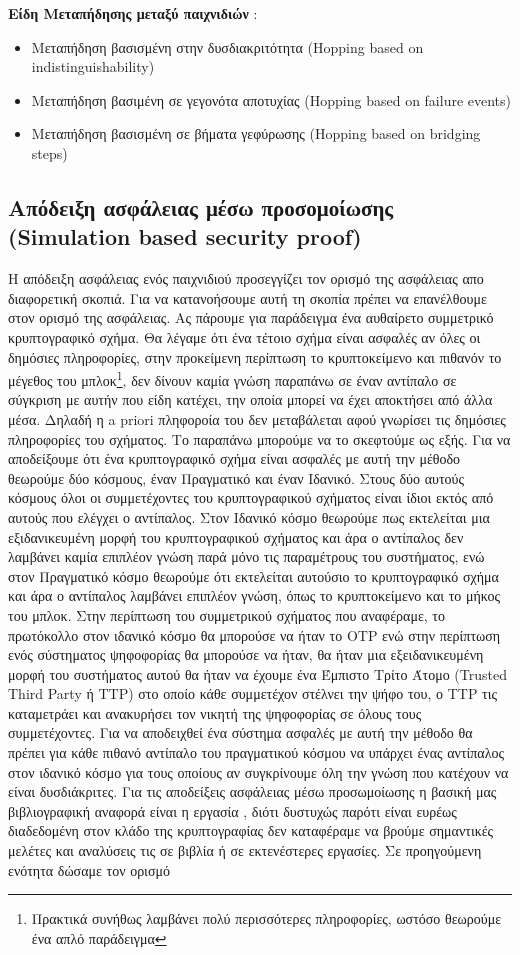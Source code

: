 \textbf{Είδη Μεταπήδησης μεταξύ παιχνιδιών} :
\begin{itemize}
    \item Μεταπήδηση βασισμένη στην δυσδιακριτότητα (Hopping based on indistinguishability)
    \item Μεταπήδηση βασιμένη σε γεγονότα αποτυχίας (Hopping based on failure events)
    \item Μεταπήδηση βασισμένη σε βήματα γεφύρωσης (Hopping based on bridging steps)
\end{itemize}


\subsection{Απόδειξη ασφάλειας μέσω προσομοίωσης (Simulation based security proof)}
Η απόδειξη ασφάλειας ενός παιχνιδιού προσεγγίζει τον ορισμό της ασφάλειας απο διαφορετική σκοπιά. Για να κατανοήσουμε αυτή τη σκοπία πρέπει να επανέλθουμε στον ορισμό της ασφάλειας. Ας πάρουμε για παράδειγμα ένα αυθαίρετο συμμετρικό κρυπτογραφικό σχήμα. Θα λέγαμε ότι ένα τέτοιο σχήμα είναι ασφαλές αν όλες οι δημόσιες πληροφορίες, στην προκείμενη περίπτωση το κρυπτοκείμενο και πιθανόν το μέγεθος του μπλοκ\footnote{Πρακτικά συνήθως λαμβάνει πολύ περισσότερες πληροφορίες, ωστόσο θεωρούμε ένα απλό παράδειγμα}, δεν δίνουν καμία γνώση παραπάνω σε έναν αντίπαλο σε σύγκριση με αυτήν που είδη κατέχει, την οποία μπορεί να έχει αποκτήσει από άλλα μέσα. Δηλαδή η a priori πληφοροία του δεν μεταβάλεται αφού γνωρίσει τις δημόσιες πληροφορίες του σχήματος. Το παραπάνω μπορούμε να το σκεφτούμε ως εξής. Για να αποδείξουμε ότι ένα κρυπτογραφικό σχήμα είναι ασφαλές με αυτή την μέθοδο θεωρούμε δύο κόσμους, έναν Πραγματικό και έναν Ιδανικό. Στους δύο αυτούς κόσμους όλοι οι συμμετέχοντες του κρυπτογραφικού σχήματος είναι ίδιοι εκτός από αυτούς που ελέγχει ο αντίπαλος. Στον Ιδανικό κόσμο θεωρούμε πως εκτελείται μια εξιδανικευμένη μορφή του κρυπτογραφικού σχήματος και άρα ο αντίπαλος δεν λαμβάνει καμία επιπλέον γνώση παρά μόνο τις παραμέτρους του συστήματος, ενώ στον Πραγματικό κόσμο θεωρούμε ότι εκτελείται αυτούσιο το κρυπτογραφικό σχήμα και άρα ο αντίπαλος λαμβάνει επιπλέον γνώση, όπως το κρυπτοκείμενο και το μήκος του μπλοκ. Στην περίπτωση του συμμετρικού σχήματος που αναφέραμε, το πρωτόκολλο στον ιδανικό κόσμο θα μπορούσε να ήταν το OTP ενώ στην περίπτωση ενός σύστηματος ψηφοφορίας θα μπορούσε να ήταν, θα ήταν μια εξειδανικευμένη μορφή του συστήματος αυτού θα ήταν να έχουμε ένα Έμπιστο Τρίτο Άτομο (Trusted Third Party ή TTP) στο οποίο κάθε συμμετέχον στέλνει την ψήφο του, ο TTP τις καταμετράει και ανακυρήσει τον νικητή της ψηφοφορίας σε όλους τους συμμετέχοντες. Για να αποδειχθεί ένα σύστημα ασφαλές με αυτή την μέθοδο θα πρέπει για κάθε πιθανό αντίπαλο του πραγματικού κόσμου να υπάρχει ένας αντίπαλος στον ιδανικό κόσμο για τους οποίους αν συγκρίνουμε όλη την γνώση που κατέχουν να είναι δυσδιάκριτες. Για τις αποδείξεις ασφάλειας μέσω προσωμοίωσης η βασική μας βιβλιογραφική αναφορά είναι η εργασία \cite{cryptoeprint:2016/046}, διότι δυστυχώς παρότι είναι ευρέως διαδεδομένη στον κλάδο της κρυπτογραφίας δεν καταφέραμε να βρούμε σημαντικές μελέτες και αναλύσεις τις σε βιβλία ή σε εκτενέστερες εργασίες. Σε προηγούμενη ενότητα δώσαμε τον ορισμό 